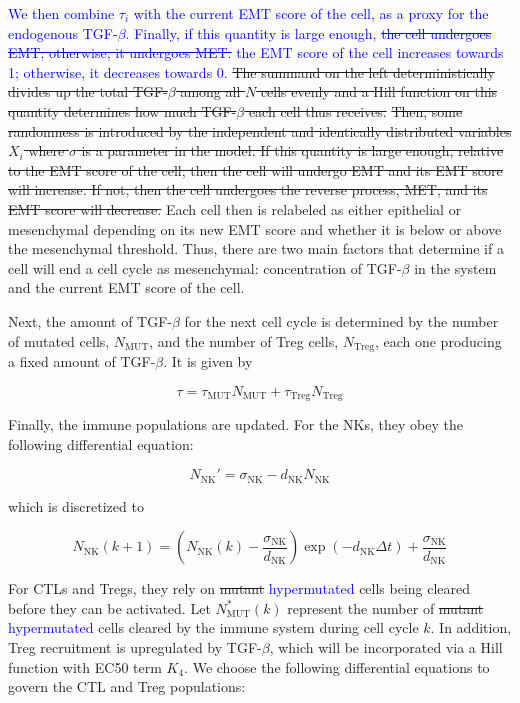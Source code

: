 \documentclass[11pt]{article}
\newcommand{\tcb} { \textcolor{blue} }
\begin{document}
\tcb{
We then combine $\tau_i$ with the current EMT score of the cell, as a proxy for the endogenous TGF-$\beta$.
Finally, if this quantity is large enough, \sout{the cell undergoes EMT; otherwise, it undergoes MET.} \tcb{the EMT score of the cell increases towards 1; otherwise, it decreases towards 0.}
}
\sout{The summand on the left deterministically divides up the total TGF-$\beta$ among all $N$ cells evenly and a Hill function on this quantity determines how much TGF-$\beta$ each cell thus receives.}
\sout{Then, some randomness is introduced by the independent and identically distributed variables $X_i$ where $\sigma$ is a parameter in the model.
If this quantity is large enough, relative to the EMT score of the cell, then the cell will undergo EMT and its EMT score will increase.
If not, then the cell undergoes the reverse process, MET, and its EMT score will decrease.
}
Each cell then is relabeled as either epithelial or mesenchymal depending on its new EMT score and whether it is below or above the mesenchymal threshold.
Thus, there are two main factors that determine if a cell will end a cell cycle as mesenchymal: concentration of TGF-$\beta$ in the system and the current EMT score of the cell.

Next, the amount of TGF-$\beta$ for the next cell cycle is determined by the number of mutated cells, $N_{\text{MUT}}$, and the number of Treg cells, $N_{\text{Treg}}$, each one producing a fixed amount of TGF-$\beta$. It is given by

\begin{equation}\tag{2.6}
\tau = \tau_{\text{MUT}}N_{\text{MUT}} + \tau_{\text{Treg}}N_{\text{Treg}}
\end{equation}


Finally, the immune populations are updated.
For the NKs, they obey the following differential equation:
 
\begin{equation}\tag{2.7}
N_{\text{NK}}' = \sigma_{\text{NK}} - d_{\text{NK}}N_{\text{NK}}
\end{equation}

which is discretized to
 
 \begin{equation}\tag{2.8}
N_{\text{NK}}(k+1) = \left (N_{\text{NK}}(k)-\frac{\sigma_{\text{NK}}}{d_{\text{NK}}} \right )\exp(-d_{\text{NK}}\Delta t)+\frac{\sigma_{\text{NK}}}{d_{\text{NK}}}
\end{equation}

For CTLs and Tregs, they rely on \sout{mutant} \tcb{hypermutated} cells being cleared before they can be activated.
Let $N_{\text{MUT}}^*(k)$ represent the number of \sout{mutant} \tcb{hypermutated} cells cleared by the immune system during cell cycle $k$.
In addition, Treg recruitment is upregulated by TGF-$\beta$, which will be incorporated via a Hill function with EC50 term $K_4$.
We choose the following differential equations to govern the CTL and Treg populations:
\end{document}
